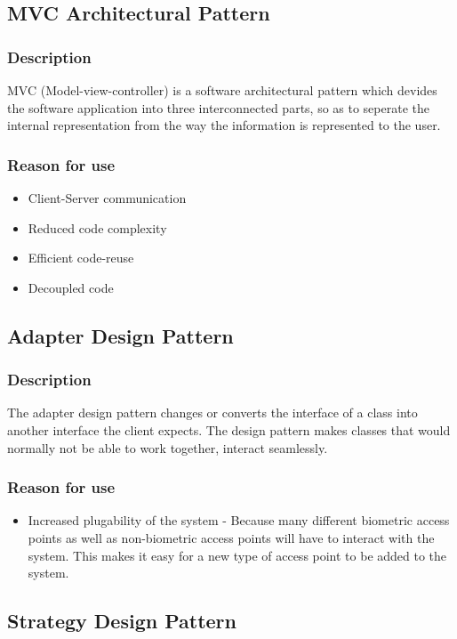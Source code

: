 \subsection{MVC Architectural Pattern}
	\subsubsection{Description}
	MVC (Model-view-controller) is a software architectural pattern which devides the software application into three interconnected parts, so as to seperate the internal representation from the way the information is represented to the user.
	\subsubsection{Reason for use}
	\begin{itemize}
		\item{Client-Server communication}
		\item{Reduced code complexity}
		\item{Efficient code-reuse}
		\item{Decoupled code}
	\end{itemize}
	
\subsection{Adapter Design Pattern}
	\subsubsection{Description}
	The adapter design pattern changes or converts the interface of a class into another interface the client expects. The design pattern makes classes that would normally not be able to work together, interact seamlessly.
	
	\subsubsection{Reason for use}
	\begin{itemize}
		\item{Increased plugability of the system} - Because many different biometric access points as well as non-biometric access points will have to interact with the system. This makes it easy for a new type of access point to be added to the system.
	\end{itemize}
	
\subsection{Strategy Design Pattern}

